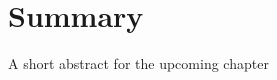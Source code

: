 \chapter{Summary}
\label{chap11}
\begin{shortAbstract}
A short abstract for the upcoming chapter
\end{shortAbstract}


